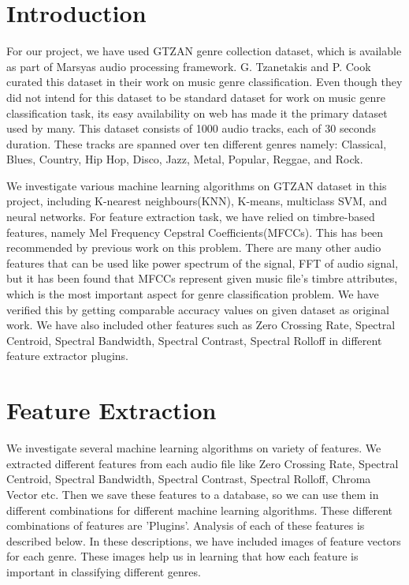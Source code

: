 \documentclass[conference]{IEEEtran}
\begin{document}
\section{Introduction}
For our project, we have used GTZAN genre collection dataset, which is available as part of Marsyas audio processing framework. G. Tzanetakis and P. Cook curated this dataset in their work\cite{gtzan} on music genre classification. Even though they did not intend for this dataset to be standard dataset for work on music genre classification task\cite{bob}, its easy availability on web has made it the primary dataset used by many\cite{michael}\cite{bob}\cite{base}. This dataset consists of 1000 audio tracks, each of 30 seconds duration. These tracks are spanned over ten different genres namely: Classical, Blues, Country, Hip Hop, Disco, Jazz, Metal, Popular, Reggae, and Rock.\par
We investigate various machine learning algorithms on GTZAN dataset in this project, including K-nearest neighbours(KNN), K-means, multiclass SVM, and neural networks. For feature extraction task, we have relied on timbre-based features, namely Mel Frequency Cepstral Coefficients(MFCCs). This has been recommended by previous work on this problem\cite{zu}. There are many other audio features that can be used like power spectrum of the signal, FFT of audio signal, but it has been found that MFCCs represent given music file's timbre attributes, which is the most important aspect for genre classification problem. We have verified this by getting comparable accuracy values on given dataset as original work\cite{gtzan}. We have also included other features such as Zero Crossing Rate, Spectral Centroid, Spectral Bandwidth, Spectral Contrast, Spectral Rolloff in different feature extractor plugins.


\section{Feature Extraction}
We investigate several machine learning algorithms on variety of features. We extracted different features from each audio file like Zero Crossing Rate, Spectral Centroid, Spectral Bandwidth, Spectral Contrast, Spectral Rolloff, Chroma Vector etc. Then we save these features to a database, so we can use them in different combinations for different machine learning algorithms. These different combinations of features are 'Plugins'. Analysis of each of these features is described below. In these descriptions, we have included images of feature vectors for each genre. These images help us in learning that how each feature is important in classifying different genres.
\end{document}

